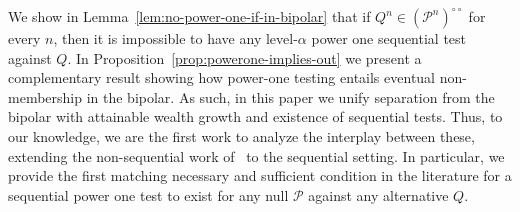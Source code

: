 \documentclass[11pt]{article}
\newcommand{\Pcal}{\mathcal{P}}
\theoremstyle{definition}
\theoremstyle{definition}
\begin{document}
We show in Lemma~\ref{lem:no-power-one-if-in-bipolar} that if $Q^n\in(\Pcal^n)^{\circ\circ}$ for every $n$, then it is impossible to have any level-$\alpha$ power one sequential test against $Q$. In Proposition~\ref{prop:powerone-implies-out} we present a complementary result showing how power-one testing entails eventual non-membership in the bipolar. As such, in this paper we unify separation from the bipolar with attainable wealth growth and existence of sequential tests. Thus, to our knowledge, we are the first work to analyze the interplay between these, extending the non-sequential work of~\cite{larsson2025numeraire} to the sequential setting. In particular, we provide the first matching necessary and sufficient condition in the literature for a sequential power one test  to exist for any null $\Pcal$ against any alternative $Q$.
\end{document}
